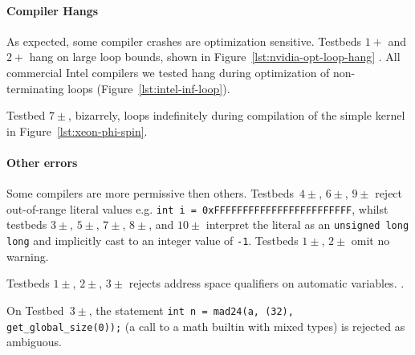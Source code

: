 \paragraph{Compiler Hangs} %
As expected, some compiler crashes are optimization sensitive. Testbeds $1+$ and $2+$ hang on large loop bounds, shown in Figure~\ref{lst:nvidia-opt-loop-hang} . All commercial Intel compilers we tested hang during optimization of non-terminating loops (Figure~\ref{lst:intel-inf-loop}).

Testbed $7\pm$, bizarrely, loops indefinitely during compilation of the simple kernel in Figure~\ref{lst:xeon-phi-spin}.

\paragraph{Other errors} %

Some compilers are more permissive then others. Testbeds~$4\pm$, $6\pm$, $9\pm$ reject out-of-range literal values e.g. \texttt{int i = 0xFFFFFFFFFFFFFFFFFFFFFFFF}, whilst testbeds $3\pm$, $5\pm$, $7\pm$, $8\pm$, and $10\pm$ interpret the literal as an \texttt{unsigned long long} and implicitly cast to an integer value of \texttt{-1}. Testbeds $1\pm$, $2\pm$ omit no warning.

Testbeds $1\pm$, $2\pm$, $3\pm$ rejects address space qualifiers on automatic variables. .

On Testbed~$3\pm$, the statement \texttt{int n = mad24(a, (32), get\_global\_size(0));} (a call to a math builtin with mixed types) is rejected as ambiguous.


%
%


